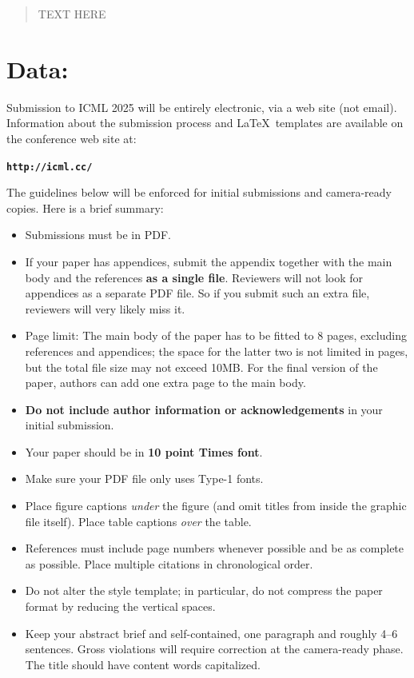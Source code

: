\documentclass{article}
\theoremstyle{plain}
\theoremstyle{definition}
\theoremstyle{remark}
\begin{document}
\printAffiliationsAndNotice{\icmlEqualContribution} %

\begin{abstract}
TEXT HERE
\end{abstract}

\section{Data:}
\label{submission}






Submission to ICML 2025 will be entirely electronic, via a web site
(not email). Information about the submission process and \LaTeX\ templates
are available on the conference web site at:
\begin{center}
\textbf{\texttt{http://icml.cc/}}
\end{center}

The guidelines below will be enforced for initial submissions and
camera-ready copies. Here is a brief summary:
\begin{itemize}
\item Submissions must be in PDF\@. 
\item If your paper has appendices, submit the appendix together with the main body and the references \textbf{as a single file}. Reviewers will not look for appendices as a separate PDF file. So if you submit such an extra file, reviewers will very likely miss it.
\item Page limit: The main body of the paper has to be fitted to 8 pages, excluding references and appendices; the space for the latter two is not limited in pages, but the total file size may not exceed 10MB. For the final version of the paper, authors can add one extra page to the main body.
\item \textbf{Do not include author information or acknowledgements} in your
    initial submission.
\item Your paper should be in \textbf{10 point Times font}.
\item Make sure your PDF file only uses Type-1 fonts.
\item Place figure captions \emph{under} the figure (and omit titles from inside
    the graphic file itself). Place table captions \emph{over} the table.
\item References must include page numbers whenever possible and be as complete
    as possible. Place multiple citations in chronological order.
\item Do not alter the style template; in particular, do not compress the paper
    format by reducing the vertical spaces.
\item Keep your abstract brief and self-contained, one paragraph and roughly
    4--6 sentences. Gross violations will require correction at the
    camera-ready phase. The title should have content words capitalized.
\end{itemize}
\end{document}
